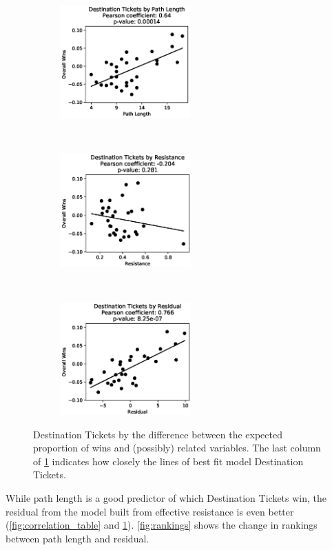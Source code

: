 \begin{figure}[H]
    \centering
    \begin{subfigure}[t]{0.33\textwidth}
        \centering
        \includegraphics[height=1.7in]{figures/correlation0}
    \end{subfigure}%
    ~ 
    \begin{subfigure}[t]{0.33\textwidth}
        \centering
        \includegraphics[height=1.7in]{figures/correlation1}
    \end{subfigure}%
    ~ 
    \begin{subfigure}[t]{0.33\textwidth}
        \centering
        \includegraphics[height=1.7in]{figures/correlation2}
    \end{subfigure}%
    \caption{Destination Tickets by the
    difference between the expected proportion of wins
    and (possibly) related variables.
    The last column of \cref{fig:correlation_figures}
    indicates how closely the lines of best fit
    model Destination Tickets.}
    \label{fig:correlation_figures}
\end{figure}

While path length is a good predictor 
of which Destination Tickets win, 
the residual from the model built from effective resistance
is even better (\cref{fig:correlation_table} and
\cref{fig:correlation_figures}).
\cref{fig:rankings} shows the change in rankings
between path length and residual.

